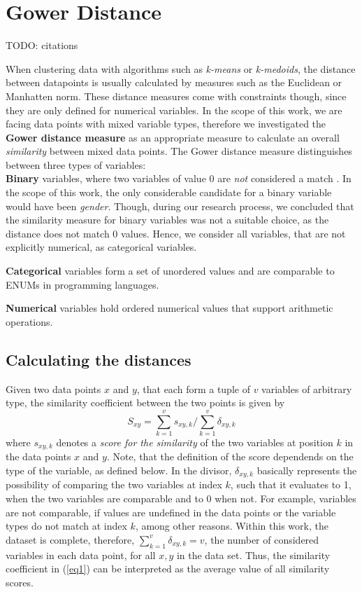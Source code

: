 \documentclass[11pt]{article}
\begin{document}
\section*{Gower Distance}

TODO: citations

When clustering data with algorithms such as \textit{k-means} or \textit{k-medoids}, the distance between datapoints is usually calculated by measures such as the Euclidean or Manhatten norm. These distance measures come with constraints though, since they are only defined for numerical variables. In the scope of this work, we are facing data points with mixed variable types, therefore we investigated the \textbf{Gower distance measure} as an appropriate measure to calculate an overall \textit{similarity} between mixed data points. The Gower distance measure distinguishes between three types of variables:\\

\textbf{Binary} variables, where two variables of value 0 are \textit{not} considered a match \cite{gower1971general}. In the scope of this work, the only considerable candidate for a binary variable would have been \textit{gender}. Though, during our research process, we concluded that the similarity measure for binary variables was not a suitable choice, as the distance does not match 0 values. Hence, we consider all variables, that are not explicitly numerical, as categorical variables.

\textbf{Categorical} variables form a set of unordered values and are comparable to ENUMs in programming languages.

\textbf{Numerical} variables hold ordered numerical values that support arithmetic operations.

\subsection*{Calculating the distances}

Given two data points $x$ and $y$, that each form a tuple of $v$ variables of arbitrary type, the similarity coefficient between the two points is given by
\begin{equation}\label{eq1}
  S_{xy} = \sum_{k=1}^{v} s_{xy,k} / \sum_{k=1}^{v} \delta_{xy,k} 
\end{equation} 
where $s_{xy,k}$ denotes a \textit{score for the similarity} of the two variables at position $k$ in the data points $x$ and $y$. Note, that the definition of the score dependends on the type of the variable, as defined below. In the divisor, $\delta_{xy,k}$ basically represents the possibility of comparing the two variables at index $k$, such that it evaluates to 1, when the two variables are comparable and to 0 when not. For example, variables are not comparable, if values are undefined in the data points or the variable types do not match at index $k$, among other reasons. Within this work, the dataset is complete, therefore, $\sum_{k=1}^{v} \delta_{xy,k}=v$, the number of considered variables in each data point, for all $x, y$ in the data set. Thus, the similarity coefficient in (\ref{eq1}) can be interpreted as the average value of all similarity scores.\\  
\end{document}
